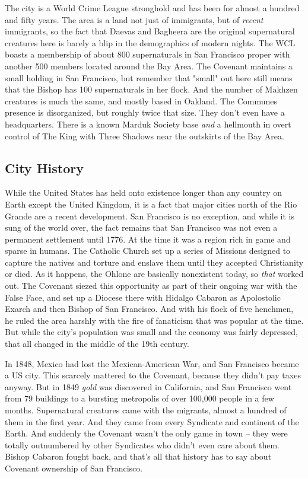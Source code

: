 The city is a World Crime League stronghold and has been for almost a hundred and fifty years. The area is a land not just of immigrants, but of \textit{recent} immigrants, so the fact that Daevas and Bagheera are the original supernatural creatures here is barely a blip in the demographics of modern nights. The WCL boasts a membership of about 800 supernaturals in San Francisco proper with another 500 members located around the Bay Area. The Covenant maintains a small holding in San Francisco, but remember that "small" out here still means that the Bishop has 100 supernaturals in her flock. And the number of Makhzen creatures is much the same, and mostly based in Oakland. The Communes presence is disorganized, but roughly twice that size. They don't even have a headquarters. There is a known Marduk Society base \textit{and} a hellmouth in overt control of The King with Three Shadows near the outskirts of the Bay Area.

\subsection{City History}

\hspace{\parindent} While the United States has held onto existence longer than any country on Earth except the United Kingdom, it is a fact that major cities north of the Rio Grande are a recent development. San Francisco is no exception, and while it is sung of the world over, the fact remains that San Francisco was not even a permanent settlement until 1776. At the time it was a region rich in game and sparse in humans. The Catholic Church set up a series of Missions designed to capture the natives and torture and enslave them until they accepted Christianity or died. As it happens, the Ohlone are basically nonexistent today, so \textit{that} worked out. The Covenant siezed this opportunity as part of their ongoing war with the False Face, and set up a Diocese there with Hidalgo Cabaron as Apolostolic Exarch and then Bishop of San Francisco. And with his flock of five henchmen, he ruled the area harshly with the fire of fanaticism that was popular at the time. But while the city's population was small and the economy was fairly depressed, that all changed in the middle of the 19th century.

In 1848, Mexico had lost the Mexican-American War, and San Francisco became a US city. This scarcely mattered to the Covenant, because they didn't pay taxes anyway. But in 1849 \textit{gold} was discovered in California, and San Francisco went from 79 buildings to a bursting metropolis of over 100,000 people in a few months. Supernatural creatures came with the migrants, almost a hundred of them in the first year. And they came from every Syndicate and continent of the Earth. And suddenly the Covenant wasn't the only game in town -- they were totally outnumbered by other Syndicates who didn't even care about them. Bishop Cabaron fought back, and that's all that history has to say about Covenant ownership of San Francisco.

